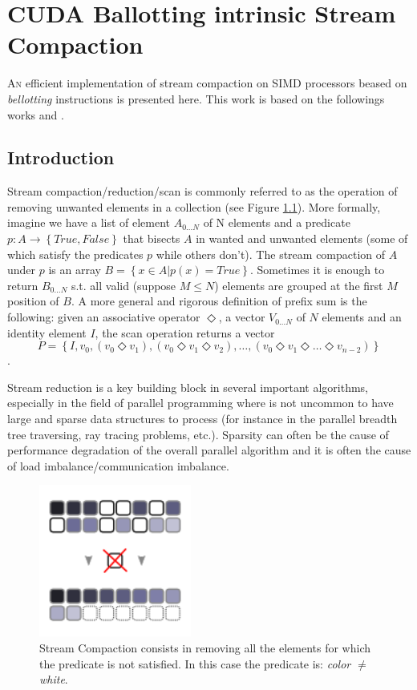 \chapter{CUDA Ballotting intrinsic Stream Compaction}
\label{ch:stream_compaction}

\lettrine[lines=3,lhang=0.33,lraise=0,loversize=0.15]{A}{n} efficient implementation of stream compaction on SIMD processors beased on \textit{bellotting} instructions is presented here.
This work is based on the followings works \cite{Billetter} and \cite{Hughes}.
\section{Introduction}
Stream compaction/reduction/scan is commonly referred to as the operation of removing unwanted elements in a collection (see Figure \ref{fig:stream_compaction}). More formally, imagine we have a list of element \(A_{0...N}\) of N elements and a predicate \(p : A \to\left \{ True,False\right \} \) that bisects \(A\) in wanted and unwanted elements (some of which satisfy the predicates \(p\) while others don't). The stream compaction of \(A\) under \(p\) is an array \(B=\left\{x \in A | p(x) = True\right\}\). Sometimes it is enough to return \(B_{0\ldots N}\) s.t. all valid (suppose \(M \leq N\)) elements are grouped at the first \(M\) position of \(B\). 
A more general  and rigorous  definition  of prefix sum  is the following: given an associative operator \(\Diamond\), a vector \(V_{0\ldots N}\) of \(N\) elements and an identity element \(I\), the scan operation returns a vector 
\[P=\left\{I,v_0,(v_0 \Diamond v_1),(v_0 \Diamond v_1 \Diamond v_2),\ldots,(v_0\Diamond v_1 \Diamond \ldots \Diamond v_{n-2})\right\}\].

Stream reduction is a key building block in several important algorithms, especially in the field of parallel programming where is not uncommon to have large and sparse data structures to process (for instance in the parallel breadth tree traversing, ray tracing problems, etc.). Sparsity can often be the cause of performance degradation of the overall parallel algorithm and it is often the cause of load imbalance/communication imbalance.
\begin{figure}
	\begin{center}
		\includegraphics[width=5cm]{./images/stream_compaction/stream_compaction}
		\caption{Stream Compaction consists in removing all the elements for which the predicate is not satisfied. In this case the predicate is: \textit{color $\ne$ white}.}
		\label{fig:stream_compaction}
	\end{center}
\end{figure}

